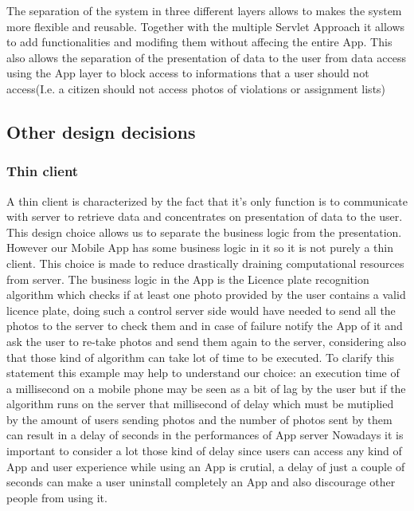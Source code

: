 The separation of the system in three different layers allows to makes the system more flexible and reusable.
Together with the multiple Servlet Approach it allows to add functionalities and modifing them without affecing the entire App.
This also allows the separation of the presentation of data to the user from data access using the App layer to block access to informations that a user should not access(I.e. a citizen should not access photos of violations or assignment lists)

\subsection{Other design decisions}
\subsubsection{Thin client }
A thin client is characterized by the fact that it's only function is to communicate with server to retrieve data and concentrates on presentation of data to the user.
\newline
This design choice allows us to separate the business logic from the presentation. However our Mobile App has some business logic in it so it is not purely a thin client. This choice is made to reduce drastically draining computational resources from server. The business logic in the App is the Licence plate recognition algorithm which checks if at least one photo provided by the user contains a valid licence plate, doing such a control server side would have needed to send all the photos to the server to check them and in case of failure notify the App of it and ask the user to re-take photos and send them again to the server, considering also that those kind of algorithm can take lot of time to be executed.
To clarify this statement this example may help to understand our choice: an execution time of a millisecond on a mobile phone may be seen as a bit of lag by the user but if the algorithm runs on the server that millisecond of delay which must be mutiplied by the amount of users sending photos and the number of photos sent by them can result in a delay of seconds in the performances of App server
Nowadays it is important to consider a lot those kind of delay since users can access any kind of App and user experience while using an App is crutial, a delay of just a couple of seconds can make a user uninstall completely an App and also discourage other people from using it.










